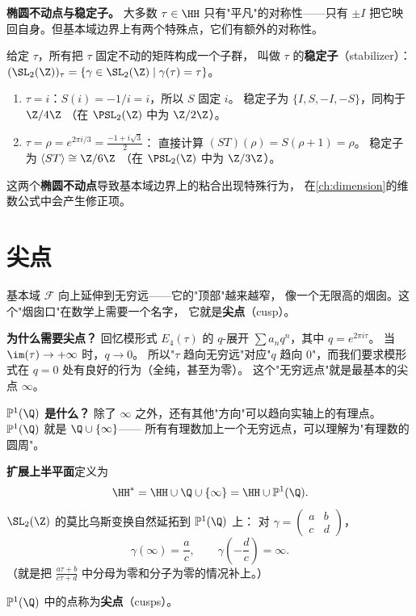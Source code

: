 \textbf{椭圆不动点与稳定子。}
\label{rem:elliptic-fixed-points}
大多数 $\tau \in \HH$ 只有"平凡"的对称性——只有 $\pm I$
把它映回自身。但基本域边界上有两个特殊点，它们有额外的对称性。

给定 $\tau$，所有把 $\tau$ 固定不动的矩阵构成一个子群，
叫做 $\tau$ 的\textbf{稳定子}（stabilizer）：
$(\SL_2(\Z))_\tau = \{\gamma \in \SL_2(\Z) \mid \gamma(\tau) = \tau\}$。

\begin{enumerate}
  \item $\tau = i$：$S(i) = -1/i = i$，所以 $S$ 固定 $i$。
    稳定子为 $\{I, S, -I, -S\}$，同构于 $\Z/4\Z$
    （在 $\PSL_2(\Z)$ 中为 $\Z/2\Z$）。
  \item $\tau = \rho = e^{2\pi i/3} = \frac{-1+i\sqrt{3}}{2}$：
    直接计算 $(ST)(\rho) = S(\rho + 1) = \rho$。
    稳定子为 $\langle ST \rangle \cong \Z/6\Z$
    （在 $\PSL_2(\Z)$ 中为 $\Z/3\Z$）。
\end{enumerate}
这两个\textbf{椭圆不动点}导致基本域边界上的粘合出现特殊行为，
在\cref{ch:dimension}的维数公式中会产生修正项。


\section{尖点}
\label{sec:cusps}

基本域 $\mathcal{F}$ 向上延伸到无穷远——它的"顶部"越来越窄，
像一个无限高的烟囱。这个"烟囱口"在数学上需要一个名字，
它就是\textbf{尖点}（cusp）。

\textbf{为什么需要尖点？}
回忆模形式 $E_4(\tau)$ 的 $q$-展开 $\sum a_n q^n$，其中 $q = e^{2\pi i\tau}$。
当 $\im(\tau) \to +\infty$ 时，$q \to 0$。
所以"$\tau$ 趋向无穷远"对应"$q$ 趋向 $0$"，而我们要求模形式在 $q = 0$
处有良好的行为（全纯，甚至为零）。
这个"无穷远点"就是最基本的尖点 $\infty$。

\textbf{$\mathbb{P}^1(\Q)$ 是什么？}
除了 $\infty$ 之外，还有其他"方向"可以趋向实轴上的有理点。
$\mathbb{P}^1(\Q)$ 就是 $\Q \cup \{\infty\}$——
所有有理数加上一个无穷远点，可以理解为"有理数的圆周"。

\begin{definition}[扩展上半平面与尖点]
\label{def:cusps}
\textbf{扩展上半平面}定义为
\[
  \HH^* = \HH \cup \Q \cup \{\infty\} = \HH \cup \mathbb{P}^1(\Q).
\]
$\SL_2(\Z)$ 的莫比乌斯变换自然延拓到 $\mathbb{P}^1(\Q)$ 上：
对 $\gamma = \begin{pmatrix} a & b \\ c & d \end{pmatrix}$，
\[
  \gamma(\infty) = \frac{a}{c}, \qquad
  \gamma\!\left(-\frac{d}{c}\right) = \infty.
\]
（就是把 $\frac{a\tau + b}{c\tau + d}$ 中分母为零和分子为零的情况补上。）

$\mathbb{P}^1(\Q)$ 中的点称为\textbf{尖点}（cusps）。
\end{definition}

